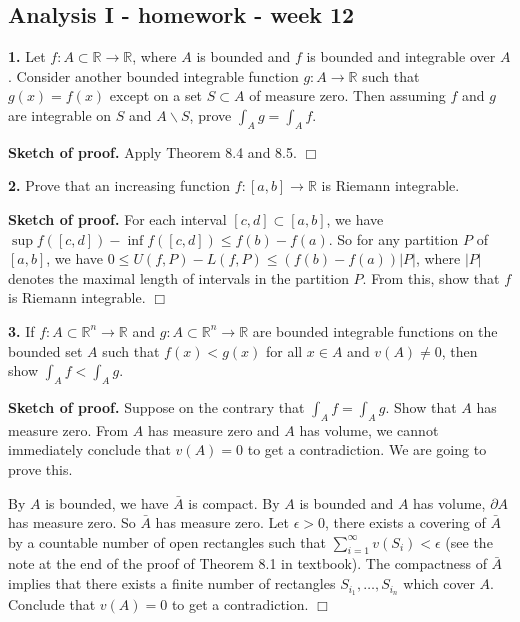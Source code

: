 \documentclass{article}
\begin{document}
    
    
    
    
    

    
    \subsection*{Analysis I - homework - week
12}\label{analysis-i---homework---week-12}

    \textbf{1.} Let $f:A\subset\mathbb{R}\to \mathbb{R}$, where $A$ is
bounded and $f$ is bounded and integrable over $A$. Consider another
bounded integrable function $g:A\to \mathbb{R}$ such that $g(x) = f(x)$
except on a set $S\subset A$ of measure zero. Then assuming $f$ and $g$
are integrable on $S$ and $A\backslash S$, prove $\int_A g = \int_A f$.

    \textbf{Sketch of proof.} Apply Theorem 8.4 and 8.5. $\Box$

    \textbf{2.} Prove that an increasing function $f:[a,b]\to \mathbb{R}$ is
Riemann integrable.

    \textbf{Sketch of proof.} For each interval $[c,d] \subset [a,b]$, we
have $\sup{f([c,d])} - \inf{f([c,d])} \le f(b) - f(a)$. So for any
partition $P$ of $[a,b]$, we have
$0\le U(f,P) - L(f,P) \le (f(b) - f(a)) |P|$, where $|P|$ denotes the
maximal length of intervals in the partition $P$. From this, show that
$f$ is Riemann integrable. $\Box$

    \textbf{3.} If $f:A\subset \mathbb{R}^n \to \mathbb{R}$ and
$g:A \subset \mathbb{R}^n \to \mathbb{R}$ are bounded integrable
functions on the bounded set $A$ such that $f(x) < g(x)$ for all
$x\in A$ and $v(A) \ne 0$, then show $\int_A f < \int_A g$.

    \textbf{Sketch of proof.} Suppose on the contrary that
$\int_A f = \int_A g$. Show that $A$ has measure zero. From $A$ has
measure zero and $A$ has volume, we cannot immediately conclude that
$v(A) = 0$ to get a contradiction. We are going to prove this.

By $A$ is bounded, we have $\bar{A}$ is compact. By $A$ is bounded and
$A$ has volume, $\partial A$ has measure zero. So $\bar{A}$ has measure
zero. Let $\epsilon > 0$, there exists a covering of $\bar{A}$ by a
countable number of open rectangles such that
$\sum_{i=1}^{\infty} v(S_i) < \epsilon$ (see the note at the end of the
proof of Theorem 8.1 in textbook). The compactness of $\bar{A}$ implies
that there exists a finite number of rectangles
$S_{i_1}, \ldots,S_{i_n}$ which cover $A$. Conclude that $v(A) = 0$ to
get a contradiction. $\Box$
\end{document}
